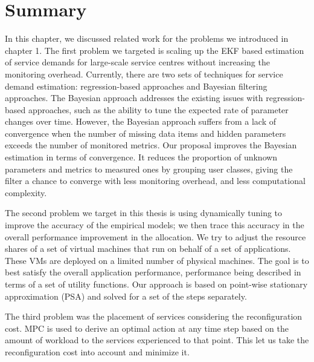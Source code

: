   \section{Summary}   
 In this chapter, we discussed related work for the problems we introduced in chapter 1. The first problem we targeted is scaling up the EKF based estimation of service demands for large-scale service centres without increasing the monitoring overhead. Currently, there are two sets of techniques for service demand estimation:  regression-based approaches and Bayesian filtering approaches. The Bayesian approach addresses the existing issues with regression-based approaches, such as  the ability to tune the expected rate of parameter changes over time.
 However, the Bayesian approach suffers from a lack of convergence when the number of missing data items and hidden parameters exceeds the number of monitored metrics. Our proposal improves the Bayesian estimation in terms of convergence. It reduces the proportion of unknown parameters and metrics to measured ones by grouping user classes, giving the filter a chance to converge with less monitoring overhead, and less computational complexity. 
 
 The second problem we target in this thesis is using dynamically tuning to improve the accuracy of the empirical models; we then trace this accuracy in the overall performance improvement in the allocation. We try to adjust the resource shares of a set of virtual machines that run on behalf of a set of applications. These VMs are deployed on a limited number of physical machines. The goal is to best satisfy the overall application performance, performance being
 described in terms of a set of utility functions. Our approach is based on point-wise stationary approximation (PSA) and solved for a set of the steps separately.
	   
	The third problem was the placement of services considering the reconfiguration cost. MPC is used to derive an optimal action at any time step based on the amount of workload to the services experienced to that point. This let us take the reconfiguration cost into account and minimize it.


